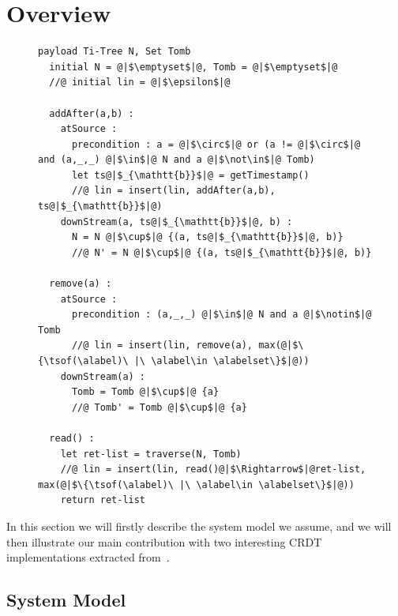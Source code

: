 \section{Overview}
\label{sec:overview}

\begin{figure}[t]
\begin{lstlisting}[basicstyle=\ttfamily\scriptsize,caption={Replicated Growing Array (RGA) CRDT pseudo-code.},captionpos=b,label={lst:rga}]
  payload Ti-Tree N, Set Tomb
  initial N = @|$\emptyset$|@, Tomb = @|$\emptyset$|@
  //@ initial lin = @|$\epsilon$|@

  addAfter(a,b) :
    atSource :
      precondition : a = @|$\circ$|@ or (a != @|$\circ$|@ and (a,_,_) @|$\in$|@ N and a @|$\not\in$|@ Tomb)
      let ts@|$_{\mathtt{b}}$|@ = getTimestamp()
      //@ lin = insert(lin, addAfter(a,b), ts@|$_{\mathtt{b}}$|@)
    downStream(a, ts@|$_{\mathtt{b}}$|@, b) :
      N = N @|$\cup$|@ {(a, ts@|$_{\mathtt{b}}$|@, b)}
      //@ N' = N @|$\cup$|@ {(a, ts@|$_{\mathtt{b}}$|@, b)}

  remove(a) :
    atSource :
      precondition : (a,_,_) @|$\in$|@ N and a @|$\notin$|@ Tomb
      //@ lin = insert(lin, remove(a), max(@|$\{\tsof(\alabel)\ |\ \alabel\in \alabelset\}$|@))
    downStream(a) :
      Tomb = Tomb @|$\cup$|@ {a}
      //@ Tomb' = Tomb @|$\cup$|@ {a}

  read() :
    let ret-list = traverse(N, Tomb)
    //@ lin = insert(lin, read()@|$\Rightarrow$|@ret-list, max(@|$\{\tsof(\alabel)\ |\ \alabel\in \alabelset\}$|@))
    return ret-list
\end{lstlisting}
\end{figure}

In this section we will firstly describe the system model
we assume, and we will then illustrate our main contribution with two
interesting CRDT implementations extracted from~\cite{AttiyaBGMYZ16,ShapiroPBZ11}.

\subsection{System Model}
\label{sec:sys-model}

